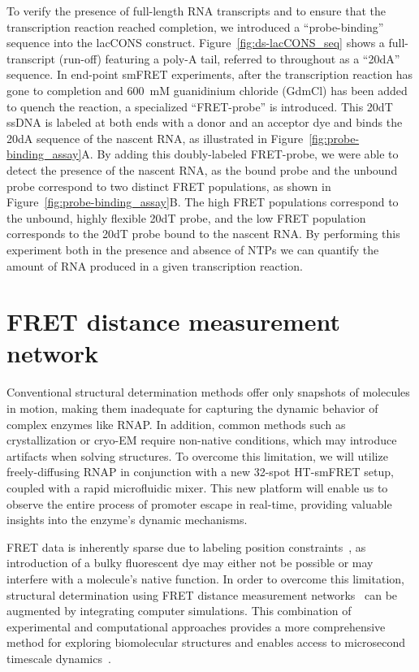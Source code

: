 To verify the presence of full-length RNA transcripts and to ensure that the transcription reaction reached completion, we introduced a \enquote{probe-binding} sequence into the \ac{lacCONS} construct.
Figure~\ref{fig:ds-lacCONS_seq} shows a full-transcript (run-off) featuring a poly-A tail, referred to throughout as a \enquote{20dA} sequence.
In end-point \ac{smFRET} experiments, after the transcription reaction has gone to completion and 600~mM guanidinium chloride (GdmCl) has been added to quench the reaction, a specialized \enquote{FRET-probe} is introduced.
This 20dT \ac{ssDNA} is labeled at both ends with a donor and an acceptor dye and binds the 20dA sequence of the nascent RNA, as illustrated in Figure~\ref{fig:probe-binding_assay}A.
By adding this doubly-labeled FRET-probe, we were able to detect the presence of the nascent RNA, as the bound probe and the unbound probe correspond to two distinct FRET populations, as shown in Figure~\ref{fig:probe-binding_assay}B. 
The high FRET populations correspond to the unbound, highly flexible 20dT probe, and the low FRET population corresponds to the 20dT probe bound to the nascent RNA.
By performing this experiment both in the presence and absence of \ac{NTP}s we can quantify the amount of RNA produced in a given transcription reaction. 

\section{FRET distance measurement network}
\label{sec:distance_network_exp}

Conventional structural determination methods offer only snapshots of molecules in motion, making them inadequate for capturing the dynamic behavior of complex enzymes like \ac{RNAP}.
In addition, common methods such as crystallization or cryo-EM require non-native conditions, which may introduce artifacts when solving structures. 
To overcome this limitation, we will utilize freely-diffusing \ac{RNAP} in conjunction with a new 32-spot \ac{HT-smFRET} setup, coupled with a rapid microfluidic mixer. 
This new platform will enable us to observe the entire process of promoter escape in real-time, providing valuable insights into the enzyme's dynamic mechanisms.

FRET data is inherently sparse due to labeling position constraints~\cite{kalinin_NatMethods_2012, muschielok_NatMethods_2008}, as introduction of a bulky fluorescent dye may either not be possible or may interfere with a molecule's native function. 
In order to overcome this limitation, structural determination using FRET distance measurement networks~\cite{hellenkamp_NatMethods_2017} can be augmented by integrating computer simulations.
This combination of experimental and computational approaches provides a more comprehensive method for exploring biomolecular structures and enables access to microsecond timescale dynamics~\cite{lerner_Science_2018, dimura_COSB_2016, kilic_NatComm_2018, dimura_NatComm_2020}.

